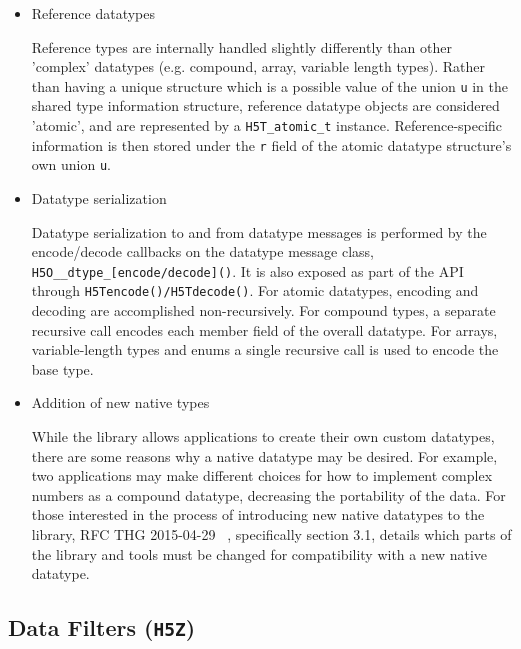 \begin{itemize}
    \item Reference datatypes

Reference types are internally handled slightly differently than other 'complex' datatypes (e.g. compound, array, variable length types). Rather than having a unique structure which is a possible value of the union \texttt{u} in the shared type information structure, reference datatype objects are considered 'atomic', and are represented by a \texttt{H5T\_atomic\_t} instance. Reference-specific information is then stored under the \texttt{r} field of the atomic datatype structure's own union \texttt{u}.

    \item Datatype serialization

Datatype serialization to and from datatype messages is performed by the encode/decode callbacks on the datatype message class, \texttt{H5O\_\_dtype\_[encode/decode]()}. It is also exposed as part of the API through \texttt{H5Tencode()/H5Tdecode()}. For atomic datatypes, encoding and decoding are accomplished non-recursively. For compound
types, a separate recursive call encodes each member field of the overall datatype. For arrays, variable-length types and enums a single recursive call is used to encode the base type.

    \item Addition of new native types
    
While the library allows applications to create their own custom datatypes, there are some reasons why a native datatype may be desired. For example, two applications may make different choices for how to implement complex numbers as a compound datatype, decreasing the portability of the data. For those interested in the process of introducing new native datatypes to the library, RFC THG 2015-04-29 ~\cite{rfc20150429}, specifically section 3.1, details which parts of the library and tools must be changed for compatibility with a new native datatype.

\end{itemize}

\subsection{Data Filters (\texttt{H5Z})}


